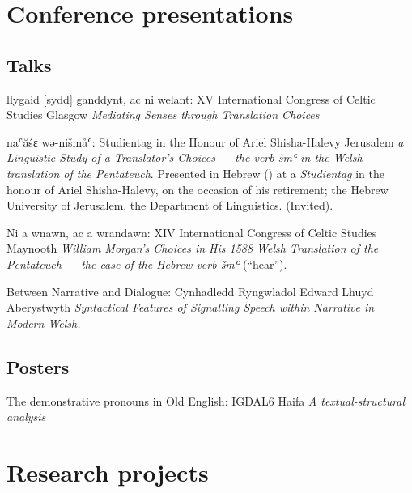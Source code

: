 \section{Conference presentations}

\subsection{Talks}

	{llygaid [sydd] ganddynt, ac ni welant:}
	{XV International Congress of Celtic Studies}
	{Glasgow}
	{}
	{\emph{Mediating Senses through Translation Choices}}

	{na{ʿ}ăśɛ wə-nišmå{ʿ}:}
	{Studientag in the Honour of Ariel Shisha-Halevy}
	{Jerusalem}
	{}
	{\emph{a Linguistic Study of a Translator’s Choices — the verb \emph{šm{ʿ}} in the Welsh translation of the Pentateuch}. Presented in Hebrew () at a \emph{Studientag} in the honour of Ariel Shisha-Halevy, on the occasion of his retirement; the Hebrew University of Jerusalem, the Department of Linguistics. (Invited).}

	{Ni a wnawn, ac a wrandawn:}
	{XIV International Congress of Celtic Studies}
	{Maynooth}
	{}
	{\emph{William Morgan’s Choices in His 1588 Welsh Translation of the Pentateuch — the case of the Hebrew verb \emph{šm{ʿ}}} (“hear”).}

	{Between Narrative and Dialogue:}
	{Cynhadledd Ryngwladol Edward Lhuyd}
	{Aberystwyth}
	{}
	{\emph{Syntactical Features of Signalling Speech within Narrative in Modern Welsh.}}


\subsection{Posters}

	{The demonstrative pronouns in Old English:}
	{IGDAL6}
	{Haifa}
	{}
	{\emph{A textual-structural analysis}}



\section{Research projects}

